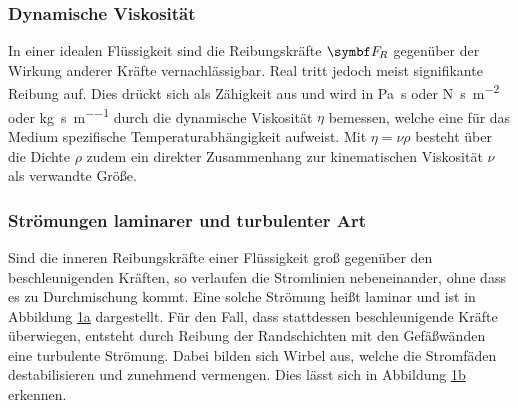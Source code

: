 \subsubsection{Dynamische Viskosität}

In einer idealen Flüssigkeit sind die Reibungskräfte $\symbf F_{\hspace{-0.15ex}R}$ gegenüber der Wirkung anderer Kräfte
vernachlässigbar. Real tritt jedoch meist signifikante Reibung auf. Dies drückt sich als Zähigkeit aus und wird in
\unit{\pascal\second} oder \unit{\newton\second\per\meter\squared} oder \unit{\kilo\gram\per\second\per\meter} durch die
dynamische Viskosität $\eta$ bemessen, welche eine für das Medium spezifische Temperaturabhängigkeit aufweist. Mit
$\eta = \nu \rho$ besteht über die Dichte $\rho$ zudem ein direkter Zusammenhang zur kinematischen Viskosität $\nu$
als verwandte Größe.

\newpage

\subsubsection{Strömungen laminarer und turbulenter Art}

Sind die inneren Reibungskräfte einer Flüssigkeit groß gegenüber den beschleunigenden Kräften, so verlaufen die Stromlinien
nebeneinander, ohne dass es zu Durchmischung kommt. Eine solche Strömung heißt laminar und ist in Abbildung
\hyperref[fig:laminar]{1a} dargestellt. Für den Fall, dass stattdessen beschleunigende Kräfte überwiegen, entsteht
durch Reibung der Randschichten mit den Gefäßwänden eine turbulente Strömung. Dabei bilden sich Wirbel aus, welche die
Stromfäden destabilisieren und zunehmend vermengen. Dies lässt sich in Abbildung \hyperref[fig:turbulent]{1b} erkennen.

